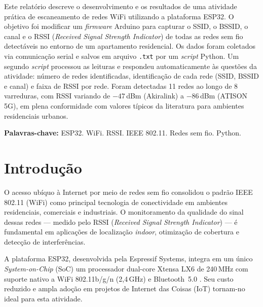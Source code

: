 \documentclass[
  12pt,
  a4paper,
  oneside,
  brazil,
  chapter=TITLE,
  section=TITLE,
]{abntex2}
\begin{document}
\begin{resumo}
Este relatório descreve o desenvolvimento e os resultados de uma atividade
prática de escaneamento de redes WiFi utilizando a plataforma ESP32.
O objetivo foi modificar um \textit{firmware} Arduino para capturar o
SSID, o BSSID, o canal e o RSSI (\textit{Received Signal Strength Indicator})
de todas as redes sem fio detectáveis no entorno de um apartamento residencial.
Os dados foram coletados via comunicação serial e salvos em arquivo \texttt{.txt}
por um \textit{script} Python. Um segundo \textit{script} processou as leituras
e respondeu automaticamente às questões da atividade: número de redes
identificadas, identificação de cada rede (SSID, BSSID e canal) e faixa de
RSSI por rede. Foram detectadas 11 redes ao longo de 8 varreduras, com RSSI
variando de $-47$\,dBm (Akiralink) a $-86$\,dBm (ATISON 5G),
em plena conformidade com valores típicos da literatura para ambientes
residenciais urbanos.

\vspace{\onelineskip}
\noindent\textbf{Palavras-chave:} ESP32. WiFi. RSSI. IEEE 802.11.
Redes sem fio. Python.
\end{resumo}

\tableofcontents*
\cleardoublepage

\textual

\chapter{Introdução}

O acesso ubíquo à Internet por meio de redes sem fio consolidou o padrão
IEEE\,802.11 (WiFi) como principal tecnologia de conectividade em ambientes
residenciais, comerciais e industriais. O monitoramento da qualidade do
sinal dessas redes --- medido pelo RSSI (\textit{Received Signal Strength
Indicator}) --- é fundamental em aplicações de localização \textit{indoor},
otimização de cobertura e detecção de interferências.

A plataforma ESP32, desenvolvida pela Espressif Systems, integra em um único
\textit{System-on-Chip} (SoC) um processador dual-core Xtensa LX6 de 240\,MHz
com suporte nativo a WiFi 802.11b/g/n (2,4\,GHz) e Bluetooth~5.0
\cite{esp32datasheet2023}. Seu custo reduzido e ampla adoção em projetos de
Internet das Coisas (IoT) tornam-no ideal para esta atividade.
\end{document}
